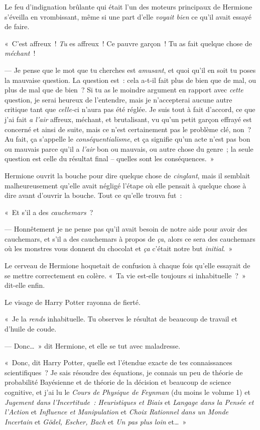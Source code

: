 Le feu d'indignation brûlante qui était l'un des moteurs principaux de Hermione s'éveilla en vrombissant, même si une part d'elle \emph{voyait bien} ce qu'il avait essayé de faire.

«~C'est affreux~! \emph{Tu} es affreux~! Ce pauvre garçon~! Tu as fait quelque chose de \emph{méchant}~!

--- Je pense que le mot que tu cherches est \emph{amusant}, et quoi qu'il en soit tu poses la mauvaise question. La question est~: cela a-t-il fait plus de bien que de mal, ou plus de mal que de bien~? Si tu as le moindre argument en rapport avec \emph{cette} question, je serai heureux de l'entendre, mais je n'accepterai aucune autre critique tant que \emph{celle-}ci n'aura pas été réglée. Je suis tout à fait d'accord, ce que j'ai fait \emph{a l'air} affreux, méchant, et brutalisant, vu qu'un petit garçon effrayé est concerné et ainsi de suite, mais ce n'est certainement pas le problème clé, non~? Au fait, ça s'appelle le \emph{conséquentialisme}, et ça signifie qu'un acte n'est pas bon ou mauvais parce qu'il a \emph{l'air} bon ou mauvais, ou autre chose du genre~; la seule question est celle du résultat final -- quelles sont les conséquences.~»

Hermione ouvrit la bouche pour dire quelque chose de \emph{cinglant}, mais il semblait malheureusement qu'elle avait négligé l'étape où elle pensait à quelque chose à dire avant d'ouvrir la bouche. Tout ce qu'elle trouva fut~:

«~Et s'il a des \emph{cauchemars}~?

--- Honnêtement je ne pense pas qu'il avait besoin de notre aide pour avoir des cauchemars, et s'il a des cauchemars à propos de \emph{ça}, alors ce sera des cauchemars où les monstres vous donnent du chocolat et \emph{ça} c'était notre but \emph{initial}.~»

Le cerveau de Hermione hoquetait de confusion à chaque fois qu'elle essayait de se mettre correctement en colère. «~Ta vie est-elle toujours si inhabituelle~?~» dit-elle enfin.

Le visage de Harry Potter rayonna de fierté.

«~Je la \emph{rends} inhabituelle. Tu observes le résultat de beaucoup de travail et d'huile de coude.

--- Donc…~» dit Hermione, et elle se tut avec maladresse.

«~Donc, dit Harry Potter, quelle est l'étendue exacte de tes connaissances scientifiques~? Je sais résoudre des équations, je connais un peu de théorie de probabilité Bayésienne et de théorie de la décision et beaucoup de science cognitive, et j'ai lu le \emph{Cours de Physique de Feynman} (du moins le volume 1) et \emph{Jugement dans l'Incertitude~: Heuristiques et Biais} et \emph{Langage dans la Pensée et l'Action} et \emph{Influence et Manipulation} et \emph{Choix Rationnel dans un Monde Incertain} et \emph{Gödel, Escher, Bach} et \emph{Un pas plus loin} et…~»

